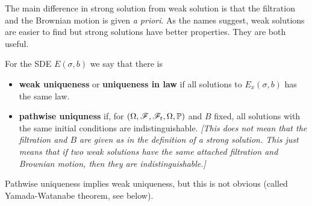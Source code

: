 \documentclass[12pt,a4paper]{article}
\renewenvironment{i}
{\begin{itemize} 
	}%
	{\end{itemize}
}
\begin{document}
The main difference in strong solution from weak solution is that the filtration and the Brownian motion is given \textit{a priori}. As the names suggest, weak solutions are easier to find but strong solutions have better properties. They are both useful.
\s

 For the SDE $E(\sigma, b)$ we say that there is
\begin{i}
\item \textbf{weak uniqueness} or \textbf{uniqueness in law} if all solutions to $E_x(\sigma, b)$ has the same law.
\item \textbf{pathwise uniquness} if, for $(\Omega, \mathscr{F}, \mathscr{F}_t, \Omega, \mathbb{P})$ and $B$ fixed, all solutions with the same initial conditions are indistinguishable. \emph{[This does not mean that the filtration and $B$ are given as in the definition of a strong solution. This just means that if two weak solutions have the same attached filtration and Brownian motion, then they are indistinguishable.]}
\end{i}
Pathwise uniqueness implies weak uniqueness, but this is not obvious (called Yamada-Watanabe theorem, see below).
\s
\end{document}
